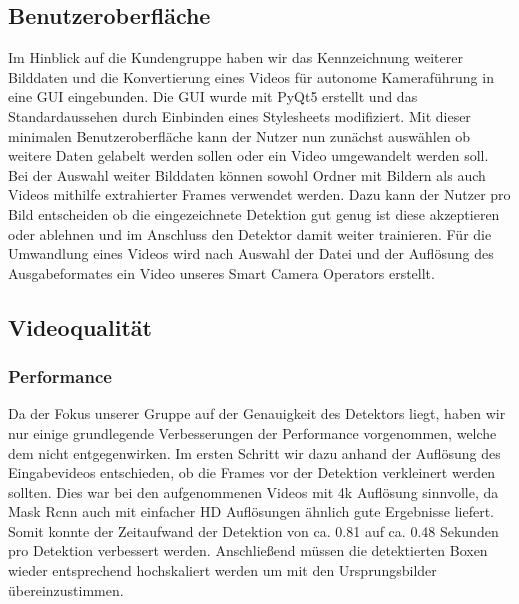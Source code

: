 \subsection*{Benutzeroberfläche}

Im Hinblick auf die Kundengruppe haben wir das Kennzeichnung weiterer Bilddaten und die Konvertierung eines Videos für autonome Kameraführung in eine GUI eingebunden. Die GUI wurde mit PyQt5 erstellt und das Standardaussehen durch Einbinden eines Stylesheets modifiziert. Mit dieser minimalen Benutzeroberfläche kann der Nutzer nun zunächst auswählen ob weitere Daten gelabelt werden sollen oder ein Video umgewandelt werden soll. Bei der Auswahl weiter Bilddaten können sowohl Ordner mit Bildern als auch Videos mithilfe extrahierter Frames verwendet werden. Dazu kann der Nutzer pro Bild entscheiden ob die eingezeichnete Detektion gut genug ist diese akzeptieren oder ablehnen und im Anschluss den Detektor damit weiter trainieren. Für die Umwandlung eines Videos wird nach Auswahl der Datei und der Auflösung des Ausgabeformates ein Video unseres Smart Camera Operators erstellt.


\subsection*{Videoqualität}
\subsubsection*{Performance}
Da der Fokus unserer Gruppe auf der Genauigkeit des Detektors liegt, haben wir nur einige grundlegende Verbesserungen der Performance vorgenommen, welche dem nicht entgegenwirken. 
Im ersten Schritt wir dazu anhand der Auflösung des Eingabevideos entschieden, ob die Frames vor der Detektion verkleinert werden sollten. Dies war bei den aufgenommenen Videos mit 4k Auflösung sinnvolle, da Mask Rcnn auch mit einfacher HD Auflösungen ähnlich gute Ergebnisse liefert. Somit konnte der Zeitaufwand der Detektion von ca. 0.81  auf ca. 0.48 Sekunden pro Detektion verbessert werden. Anschließend müssen die detektierten Boxen wieder entsprechend hochskaliert werden um mit den Ursprungsbilder übereinzustimmen.

